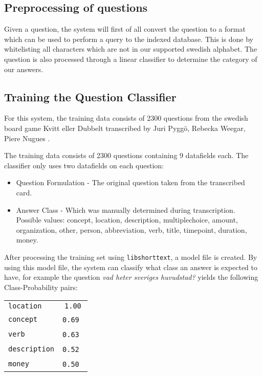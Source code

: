\subsection{Preprocessing of questions}
Given a question, the system will first of all convert the question
to a format which can be used to perform a query to the indexed
database. This is done by whitelisting all characters which
are not in our supported swedish alphabet. The question is also
processed through a linear classifier to determine the category of our 
answers.

\subsection{Training the Question Classifier}
For this system, the training data consists of 2300 questions 
from the swedish board game Kvitt eller Dubbelt transcribed 
by Juri Pygg\"o, Rebecka Weegar, Piere Nugues \cite{QASYS}.

The training data consists of 2300 questions containing 9 datafields each.
The classifier only uses two datafields on each question:
\begin{itemize}
\item Question Formulation - The original question taken from the transcribed
  card.
\item Answer Class - Which was manually determined during transcription. 
  Possible values: concept, location, description, multiplechoice, amount, organization, 
  other, person, abbreviation, verb, title, timepoint, duration, money.
\end{itemize}
After processing the training set using \texttt{libshorttext}, a model file is created.
By using this model file, the system can classify 
what class an answer is expected to have, for example the question \textit{vad heter sveriges huvudstad?} 
yields the following Class-Probability pairs:
\begin{center}
  \begin{tabular} {l c}
    \texttt{location}    & \texttt{1.00} \\
    \texttt{concept}     & \texttt{0.69} \\
    \texttt{verb}        & \texttt{0.63} \\
    \texttt{description} & \texttt{0.52} \\
    \texttt{money}       & \texttt{0.50} \\
  \end{tabular}
\end{center}
